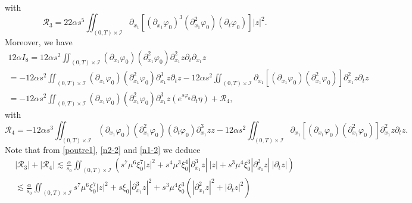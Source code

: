 \documentclass[a4paper, 12pt]{article}
\theoremstyle{plain}
\theoremstyle{definition}
\numberwithin{theorem}{section}
\numberwithin{equation}{section}
\begin{document}
{\begin{multline*}
\end{multline*}
with 
$$
\mathcal{R}_3=22 \alpha s^5\iint_{(0,T)\times\mathcal{I}}\partial_{x_1}[(\partial_{x_1}\varphi_0)^3(\partial^2_{x_1}\varphi_0)(\partial_t\varphi_0)]|z|^2.
$$
Moreover, we have
\begin{multline*}
12 \alpha I_8=12\alpha s^2\iint_{(0,T)\times\mathcal{I}}(\partial_{x_1}\varphi_0)(\partial^2_{x_1}\varphi_0)\partial^2_{x_1}z\partial_t\partial_{x_1}z\\
=- 12\alpha s^2\iint_{(0,T)\times\mathcal{I}}(\partial_{x_1}\varphi_0)(\partial^2_{x_1}\varphi_0)\partial^3_{x_1}z\partial_tz- 12\alpha s^2\iint_{(0,T)\times\mathcal{I}}\partial_{x_1}[(\partial_{x_1}\varphi_0)(\partial^2_{x_1}\varphi_0)]\partial^2_{x_1}z\partial_tz\\
=-12 \alpha s^2\iint_{(0,T)\times\mathcal{I}}(\partial_{x_1}\varphi_0)(\partial^2_{x_1}\varphi_0)\partial^3_{x_1}z(e^{s\varphi_0}\partial_t \eta)+\mathcal{R}_4,
\end{multline*}
with 
$$
\mathcal{R}_4=-12 \alpha s^3\iint_{(0,T)\times\mathcal{I}}(\partial_{x_1}\varphi_0)(\partial^2_{x_1}\varphi_0)(\partial_t\varphi_0)\partial^3_{x_1}z z- 12 \alpha s^2\iint_{(0,T)\times\mathcal{I}}\partial_{x_1}[(\partial_{x_1}\varphi_0)(\partial^2_{x_1}\varphi_0)]\partial^2_{x_1}z\partial_tz.
$$
Note that from \eqref{poutre1}, \eqref{n2-2} and \eqref{n1-2} we deduce
\begin{multline}\label{EstR5}
|\mathcal{R}_3|+|\mathcal{R}_4|\lesssim  \frac{\alpha}{s_0}\iint_{(0,T)\times\mathcal{I}}(s^7\mu^6 \xi_0^7 |z|^2+s^4\mu^3 \xi_0^4 |\partial^3_{x_1}z|~|z|+s^3\mu^4 \xi_0^3 |\partial^2_{x_1}z|~|\partial_tz|)\\
\lesssim \frac{\alpha}{s_0}\iint_{(0,T)\times\mathcal{I}} s^7\mu^6 \xi_0^7|z|^2+s \xi_0 |\partial^3_{x_1}z|^2+s^3\mu^4 \xi_0^3 (|\partial^2_{x_1}z|^2+|\partial_tz|^2)
\end{multline}

}
\end{document}
